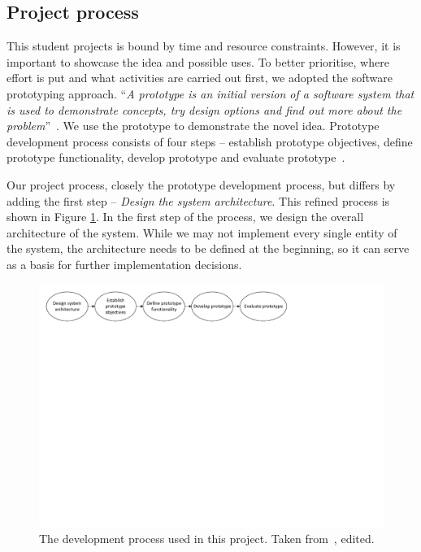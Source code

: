 \subsection{Project process}

This student projects is bound by time and resource constraints. However, it is important to showcase the idea and possible uses. To better prioritise, where effort is put and what activities are carried out first, we adopted the software prototyping approach. ``\textit{A prototype is an initial version of a software system that is used to demonstrate concepts, try design options and find out more about the problem}''~\cite{Sommerville2011SoftwareEngineering}. We use the prototype to demonstrate the novel idea. Prototype development process consists of four steps -- establish prototype objectives, define prototype functionality, develop prototype and evaluate prototype~\cite{Sommerville2011SoftwareEngineering}.

Our project process, closely the prototype development process, but differs by adding the first step -- \textit{Design the system architecture}. This refined process is shown in Figure \ref{fig:prototype-process}. In the first step of the process, we design the overall architecture of the system. While we may not implement every single entity of the system, the architecture needs to be defined at the beginning, so it can serve as a basis for further implementation decisions.

\begin{figure}
    \centering
    \includegraphics[width=\textwidth]{prototype-process-m}
    \caption{The development process used in this project. Taken from~\cite[p. 45]{Sommerville2011SoftwareEngineering}, edited.}
    \label{fig:prototype-process}
\end{figure}

